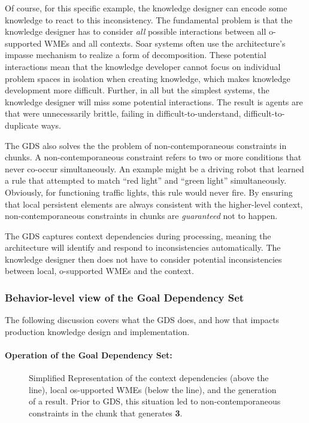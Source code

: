 Of course, for this specific example, the knowledge designer can
encode some knowledge to react to this inconsistency. The fundamental
problem is that the knowledge designer has to consider \emph{all}
possible interactions between all o-supported WMEs and all contexts.
Soar systems often use the architecture's impasse mechanism to realize
a form of decomposition. These potential interactions mean that the
knowledge developer cannot focus on individual problem spaces in isolation when
creating knowledge, which makes knowledge development more difficult.
Further, in all but the simplest systems, the knowledge designer will
miss some potential interactions. The result is agents are that were
unnecessarily brittle, failing in difficult-to-understand,
difficult-to-duplicate ways.  

The GDS also solves the the problem of non-contemporaneous constraints
in chunks. A non-contemporaneous constraint refers to two or more
conditions that never co-occur simultaneously. An example might be a
driving robot that learned a rule that attempted to match ``red
light'' and ``green light'' simultaneously. Obviously, for functioning
traffic lights, this rule would never fire. By ensuring that local
persistent elements are always consistent with the higher-level
context, non-contemporaneous constraints in chunks are
\emph{guaranteed} not to happen.


The GDS captures context dependencies during processing, meaning the
architecture will identify and respond to inconsistencies
automatically.  The knowledge designer then does not have to consider
potential inconsistencies between local, o-supported WMEs and the
context.


\subsubsection{Behavior-level view of the Goal Dependency Set}

The following discussion covers what the GDS does, and how that impacts
production knowledge design and implementation.

\paragraph{Operation of the Goal Dependency Set:}


\begin{figure}
	\caption{Simplified Representation of the context dependencies (above the line), local os-upported WMEs (below the line), and the generation of a result.  Prior to GDS, this situation led to non-contemporaneous constraints in the chunk that generates {\bf 3}.}
	\label{'ncc'}
\end{figure}

